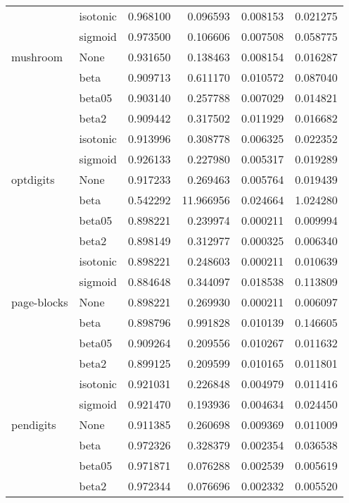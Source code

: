 \begin{tabular}{llrrrr}
        & isotonic &  0.968100 &   0.096593 &  0.008153 &  0.021275 \\
        & sigmoid &  0.973500 &   0.106606 &  0.007508 &  0.058775 \\
mushroom & None &  0.931650 &   0.138463 &  0.008154 &  0.016287 \\
        & beta &  0.909713 &   0.611170 &  0.010572 &  0.087040 \\
        & beta05 &  0.903140 &   0.257788 &  0.007029 &  0.014821 \\
        & beta2 &  0.909442 &   0.317502 &  0.011929 &  0.016682 \\
        & isotonic &  0.913996 &   0.308778 &  0.006325 &  0.022352 \\
        & sigmoid &  0.926133 &   0.227980 &  0.005317 &  0.019289 \\
optdigits & None &  0.917233 &   0.269463 &  0.005764 &  0.019439 \\
        & beta &  0.542292 &  11.966956 &  0.024664 &  1.024280 \\
        & beta05 &  0.898221 &   0.239974 &  0.000211 &  0.009994 \\
        & beta2 &  0.898149 &   0.312977 &  0.000325 &  0.006340 \\
        & isotonic &  0.898221 &   0.248603 &  0.000211 &  0.010639 \\
        & sigmoid &  0.884648 &   0.344097 &  0.018538 &  0.113809 \\
page-blocks & None &  0.898221 &   0.269930 &  0.000211 &  0.006097 \\
        & beta &  0.898796 &   0.991828 &  0.010139 &  0.146605 \\
        & beta05 &  0.909264 &   0.209556 &  0.010267 &  0.011632 \\
        & beta2 &  0.899125 &   0.209599 &  0.010165 &  0.011801 \\
        & isotonic &  0.921031 &   0.226848 &  0.004979 &  0.011416 \\
        & sigmoid &  0.921470 &   0.193936 &  0.004634 &  0.024450 \\
pendigits & None &  0.911385 &   0.260698 &  0.009369 &  0.011009 \\
        & beta &  0.972326 &   0.328379 &  0.002354 &  0.036538 \\
        & beta05 &  0.971871 &   0.076288 &  0.002539 &  0.005619 \\
        & beta2 &  0.972344 &   0.076696 &  0.002332 &  0.005520 \\

\end{tabular}
